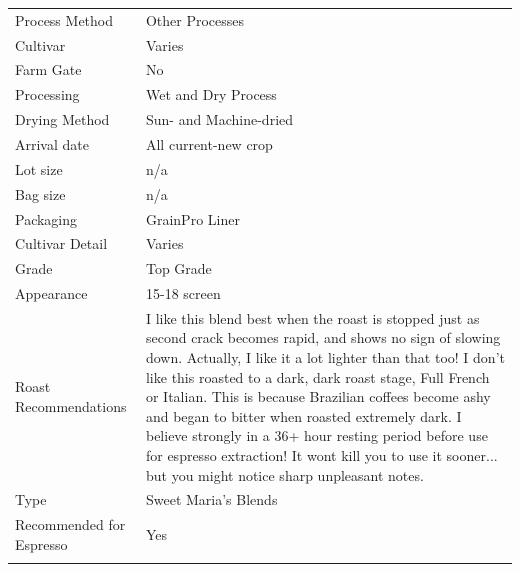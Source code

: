 \documentclass[10pt,twoside,footinclude=true,headinclude=true]{scrbook} %
\newlength{\mysize}
\newcommand{\myfontsize}[1]{
  \setlength{\mysize}{#1pt}
  \fontsize{\mysize}{1.2\mysize}
  \selectfont
}
\begin{document}
\vspace{1mm}
\begin{table}[htbp]
\myfontsize{6.5}
\hspace*{2.2em}
\begin{tabular}{ >{\raggedleft\arraybackslash}p{3.6cm}!{\color{lightgray}\vrule}p{7cm} }
\hline
  Process Method & Other Processes \\
  \hline
  Cultivar & Varies \\
  \hline
  Farm Gate & No \\
  \hline
  Processing & Wet and Dry Process \\
  \hline
  Drying Method & Sun- and Machine-dried \\
  \hline
  Arrival date & All current-new crop \\
  \hline
  Lot size & n/a \\
  \hline
  Bag size & n/a \\
  \hline
  Packaging & GrainPro Liner \\
  \hline
  Cultivar Detail & Varies \\
  \hline
  Grade & Top Grade \\
  \hline
  Appearance & 15-18 screen \\
  \hline
  Roast Recommendations & I like this blend best when the roast is stopped just as second crack becomes rapid, and shows no sign of slowing down. Actually, I like it a lot lighter than that too! I don't like this roasted to a dark, dark roast stage, Full French or Italian. This is because Brazilian coffees become ashy and began to bitter when roasted extremely dark. I believe strongly in a 36+ hour resting period before use for espresso extraction! It wont kill you to use it sooner... but you might notice sharp unpleasant notes. \\
  \hline
  Type & Sweet Maria's Blends \\
  \hline
  Recommended for Espresso & Yes \\
  \hline

\end{tabular}
\end{table}
\end{document}
